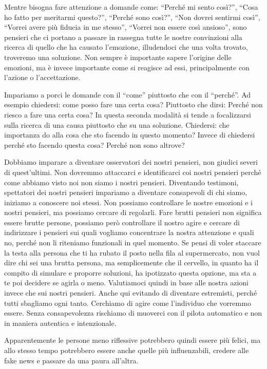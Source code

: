 \documentclass[12pt]{book} %
\begin{document}
Mentre bisogna fare attenzione a domande come: “Perché mi sento così?”, “Cosa ho fatto per meritarmi questo?”, “Perché
sono così?”, “Non dovrei sentirmi così”, “Vorrei avere più fiducia in me stesso”, “Vorrei non essere così ansioso”,
sono pensieri che ci portano a passare in rassegna tutte le nostre convinzioni alla ricerca di quello che ha causato
l'emozione, illudendoci che una volta trovato, troveremo una soluzione. Non sempre è importante
sapere l'origine delle emozioni, ma è invece importante come si reagisce ad essi, principalmente con l'azione o l'accettazione.

Impariamo a porci le domande con il “come” piuttosto che con il “perché”. Ad esempio chiedersi: come posso fare una
certa cosa? Piuttosto che dirsi: Perché non riesco a fare una certa cosa? In questa seconda modalità si tende a focalizzarsi sulla ricerca di una causa piuttosto che su una soluzione. Chiedersi: che importanza do alla cosa che sto facendo in questo momento?
Invece di chiedersi perché sto facendo questa cosa? Perché non sono altrove? 

Dobbiamo imparare a diventare osservatori dei nostri pensieri, non giudici severi di quest'ultimi. Non dovremmo
attaccarci e identificarci coi nostri pensieri perché come abbiamo visto noi non siamo i nostri pensieri. Diventando
testimoni, spettatori dei nostri pensieri impariamo a diventare consapevoli di chi siamo, iniziamo a conoscere noi
stessi. Non possiamo controllare le nostre emozioni e i nostri pensieri, ma possiamo cercare di regolarli. Fare brutti
pensieri non significa essere brutte persone, possiamo però controllare il nostro agire e cercare di indirizzare i pensieri
sui quali vogliamo concentrare la nostra attenzione e quali no, perché non li riteniamo funzionali in quel momento. Se pensi di
voler staccare la testa alla persona che ti ha rubato il posto nella fila al supermercato, non vuol dire chi sei una
brutta persona, ma semplicemente che il cervello, in quanto ha il compito di simulare e proporre soluzioni, ha
ipotizzato questa opzione, ma sta a te poi decidere se agirla o meno. Valutiamoci quindi in base alle nostra azioni
invece che sui nostri pensieri. Anche qui evitando di diventare estremisti, perché tutti sbagliamo ogni tanto.
Cerchiamo di agire come l'individuo che vorremmo essere. Senza consapevolezza rischiamo di muoverci con il pilota automatico e non in maniera autentica e intenzionale.

Apparentemente le persone meno riflessive potrebbero quindi essere più felici, ma allo stesso tempo potrebbero essere anche quelle più influenzabili, credere alle fake news e passare da una paura all'altra.
\end{document}
